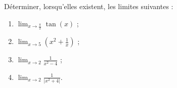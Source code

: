 
\begin{exercice}[\boringexo]\label{exoTD2A-1}

Déterminer, lorsqu'elles existent, les limites suivantes :
\begin{enumerate}
\item
  $\displaystyle \lim_{x\to \frac{\pi}{2}}\tan(x)$ ;
\item
  $\displaystyle \lim_{x\to 5}\left(x^2+\frac{1}{x}\right)$ ;
\item
  $\displaystyle \lim_{x\to 2}\frac{1}{x^2-4}$ ;
\item
  $\displaystyle \lim_{x\to 2}\frac{1}{|x^2+4|}$.
\end{enumerate}
\end{exercice}

